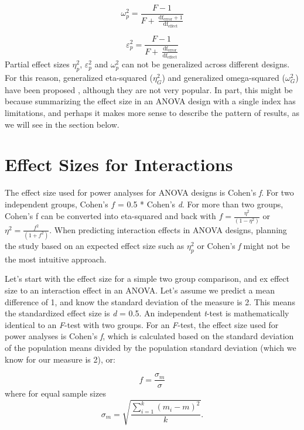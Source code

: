 \documentclass[
  oneside]{book}
\begin{document}
\[
\omega_{p}^{2} = \frac{F - 1}{F + \ \frac{\text{df}_{\text{error}} + 1}{\text{df}_{\text{effect}}}}
\]

\[
\varepsilon_{p}^{2} = \frac{F - 1}{F + \ \frac{\text{df}_{\text{error}}}{\text{df}_{\text{effect}}}}
\]
Partial effect sizes \(\eta_{p}^{2}\), \(\varepsilon_{p}^{2}\) and \(\omega_{p}^{2}\) can not be generalized across different designs. For this reason, generalized eta-squared (\(\eta_{G}^{2}\)) and generalized omega-squared (\(\omega_{G}^{2}\)) have been proposed \citep{olejnik_generalized_2003}, although they are not very popular. In part, this might be because summarizing the effect size in an ANOVA design with a single index has limitations, and perhaps it makes more sense to describe the pattern of results, as we will see in the section below.

\hypertarget{effect-sizes-for-interactions}{%
\section{Effect Sizes for Interactions}\label{effect-sizes-for-interactions}}

The effect size used for power analyses for ANOVA designs is Cohen's \emph{f}. For two independent groups, Cohen's \(f\) = 0.5 * Cohen's \emph{d}. For more than two groups, Cohen's f can be converted into eta-squared and back with \(f = \frac{\eta^2}{(1 - \eta^2)}\) or \(\eta^2 = \frac{f^2}{(1 + f^2)}\). When predicting interaction effects in ANOVA designs, planning the study based on an expected effect size such as \(\eta_{p}^{2}\) or Cohen's \emph{f} might not be the most intuitive approach.

Let's start with the effect size for a simple two group comparison, and ex effect size to an interaction effect in an ANOVA. Let's assume we predict a mean difference of 1, and know the standard deviation of the measure is 2. This means the standardized effect size is \emph{d} = 0.5. An independent \emph{t}-test is mathematically identical to an \emph{F}-test with two groups. For an \emph{F}-test, the effect size used for power analyses is Cohen's \emph{f}, which is calculated based on the standard deviation of the population means divided by the population standard deviation (which we know for our measure is 2), or:

\begin{equation}
f = \frac{\sigma _{ m }}{\sigma}
\end{equation}
where for equal sample sizes
\begin{equation}
\sigma _{ m } = \sqrt { \frac { \sum_ { i = 1 } ^ { k } ( m _ { i } - m ) ^ { 2 } } { k } }.
\end{equation}
\end{document}
